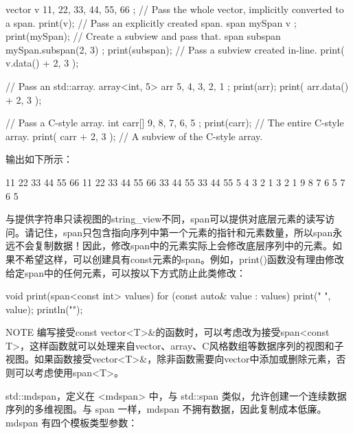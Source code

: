 \begin{cpp}
vector v { 11, 22, 33, 44, 55, 66 };
// Pass the whole vector, implicitly converted to a span.
print(v);
// Pass an explicitly created span.
span mySpan { v };
print(mySpan);
// Create a subview and pass that.
span subspan { mySpan.subspan(2, 3) };
print(subspan);
// Pass a subview created in-line.
print({ v.data() + 2, 3 });

// Pass an std::array.
array<int, 5> arr { 5, 4, 3, 2, 1 };
print(arr);
print({ arr.data() + 2, 3 });

// Pass a C-style array.
int carr[] { 9, 8, 7, 6, 5 };
print(carr); // The entire C-style array.
print({ carr + 2, 3 }); // A subview of the C-style array.
\end{cpp}

输出如下所示：

\begin{shell}
11 22 33 44 55 66
11 22 33 44 55 66
33 44 55
33 44 55
5 4 3 2 1
3 2 1
9 8 7 6 5
7 6 5
\end{shell}

与提供字符串只读视图的string\_view不同，span可以提供对底层元素的读写访问。请记住，span只包含指向序列中第一个元素的指针和元素数量，所以span永远不会复制数据！因此，修改span中的元素实际上会修改底层序列中的元素。如果不希望这样，可以创建具有const元素的span。例如，print()函数没有理由修改给定span中的任何元素，可以按以下方式防止此类修改：

\begin{cpp}
void print(span<const int> values)
{
    for (const auto& value : values) { print("{} ", value); }
    println("");
}
\end{cpp}

\begin{myNotic}{NOTE}
编写接受const vector<T>\&的函数时，可以考虑改为接受span<const T>，这样函数就可以处理来自vector、array、C风格数组等数据序列的视图和子视图。如果函数接受vector<T>\&，除非函数需要向vector中添加或删除元素，否则可以考虑使用span<T>。
\end{myNotic}



std::mdspan，定义在 <mdspan> 中，与 std::span 类似，允许创建一个连续数据序列的多维视图。与 span 一样，mdspan 不拥有数据，因此复制成本低廉。mdspan 有四个模板类型参数：

